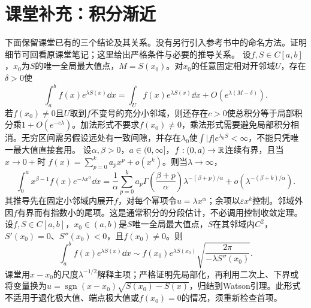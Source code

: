 \section{课堂补充：积分渐近}
下面保留课堂已有的三个结论及其关系。没有另行引入参考书中的命名方法。证明细节可回看原课堂笔记；这里给出严格条件与必要的推导关系。
设$f,S\in C[a,b]$，$x_0$为$S$的唯一全局最大值点，$M=S(x_0)$。对$x_0$的任意固定相对开邻域$U$，存在$\delta>0$使
\[
 \int_a^bf(x)e^{\lambda S(x)}\dd x
 =\int_U f(x)e^{\lambda S(x)}\dd x+O(e^{\lambda(M-\delta)}).
\]
若$f(x_0)\ne0$且$U$取到$f$不变号的充分小邻域，则还存在$c>0$使总积分等于局部积分乘$1+O(e^{-c\lambda})$。加法形式不要求$f(x_0)\ne0$，乘法形式需要避免局部积分相消。无穷区间需另假设远处有一致间隙，并存在$\lambda_0$使$\int|f|e^{\lambda_0S}<\infty$，不能只凭唯一最大值直接套用。
设$\alpha,\beta>0$，$a\in(0,\infty]$，$f:(0,a)\to\mathbb R$连续有界，且当$x\to0+$时
$f(x)=\sum_{p=0}^k a_px^p+o(x^k)$。则当$\lambda\to\infty$，
\[
 \int_0^a x^{\beta-1}f(x)e^{-\lambda x^\alpha}\dd x
 =\frac1\alpha\sum_{p=0}^k a_p\Gamma\!\left(\frac{\beta+p}{\alpha}\right)
       \lambda^{-(\beta+p)/\alpha}
 +o(\lambda^{-(\beta+k)/\alpha}).
\]
其推导先在固定小邻域内展开$f$，对每个幂项令$u=\lambda x^\alpha$；余项以$\varepsilon x^k$控制。邻域外因$f$有界而有指数小的尾项。这是通常积分的分段估计，不必调用控制收敛定理。
设$f,S\in C[a,b]$，$x_0\in(a,b)$是$S$唯一全局最大值点，$S$在其邻域内$C^2$，$S'(x_0)=0$、$S''(x_0)<0$，且$f(x_0)\ne0$。则
\[
 \int_a^bf(x)e^{\lambda S(x)}\dd x
 \sim f(x_0)e^{\lambda S(x_0)}
       \sqrt{\frac{2\pi}{-\lambda S''(x_0)}}.
\]
课堂用$x-x_0$的尺度$\lambda^{-1/2}$解释主项；严格证明先局部化，再利用二次上、下界或将变量换为$u=\operatorname{sgn}(x-x_0)\sqrt{S(x_0)-S(x)}$，归结到Watson引理。此形式不适用于退化极大值、端点极大值或$f(x_0)=0$的情况，须重新检查首项。

